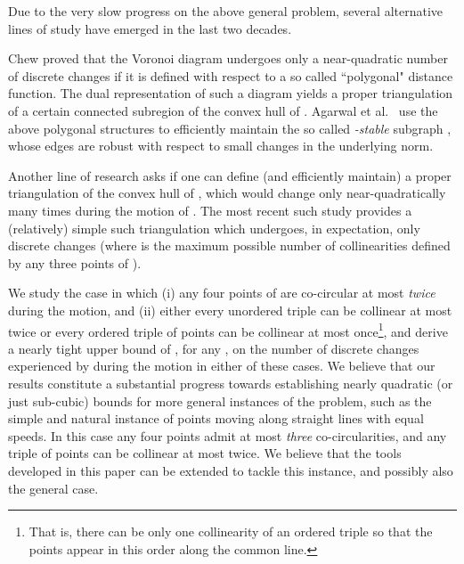 \documentclass[letter,11pt]{article}
\begin{document}
Due to the very slow progress on the above general problem, several alternative lines of study have emerged in the last two decades.

Chew \cite{Chew} proved that the Voronoi diagram undergoes only a near-quadratic number of discrete changes if it is defined with respect to a so called ``polygonal" distance function. The dual representation of such a diagram  yields a proper triangulation of a certain connected subregion of the convex hull of . Agarwal et al.~\cite{Stable} use the above polygonal structures
to efficiently maintain the so called {\it -stable} subgraph , whose edges are robust with respect to small changes in the underlying norm. 

Another line of research \cite{ABGHZ,AWY,KRS} asks if one can define (and efficiently maintain) a proper triangulation of the convex hull of , which would change only near-quadratically many times during the motion of . 
The most recent such study \cite{KRS} provides a (relatively) simple such triangulation which undergoes, in expectation, only  discrete changes (where  is the maximum possible number of collinearities defined by any three points of ).



\smallskip
{}
We study the case in which (i) any four points of  are co-circular at most {\it twice} during the motion, and (ii) either every unordered triple can be collinear at most twice or every ordered triple of points can be collinear at most once\footnote{That is, there can be only one collinearity of an ordered triple  so that the points appear in this order along the common line.}, and derive a nearly tight upper bound of , for any , on the number of discrete changes experienced by  during the motion in either of these cases.
We believe that our results constitute a substantial progress towards establishing nearly quadratic (or just sub-cubic) bounds for more general instances of the problem, such as the simple and natural instance of points moving along straight lines with equal speeds. In this case any four points admit at most {\it three} co-circularities, and any triple of points can be collinear at most twice. We believe that the tools developed in this paper can be extended to tackle this instance, and possibly also the general case.
\end{document}
